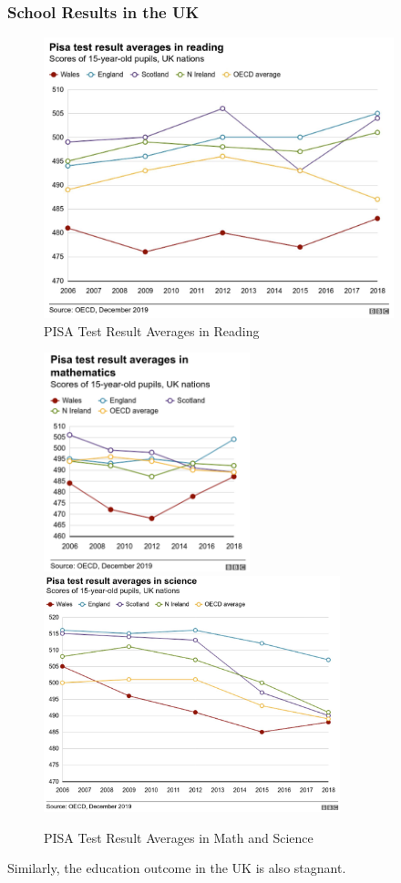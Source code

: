         \subsubsection{School Results in the UK}
            \begin{figure}[H]
                \centering
                \includegraphics[width=4in]{images/ch9/9 uk result 1.png}
                \caption{PISA Test Result Averages in Reading}
            \end{figure}
            \begin{figure}[H]
                \centering
                \includegraphics[height=2.5in]{images/ch9/9 uk result 2.png}
                \includegraphics[height=2.7in]{images/ch9/9 uk result 3.png}
                \caption{PISA Test Result Averages in Math and Science}
            \end{figure}
            Similarly, the education outcome in the UK is also stagnant.

